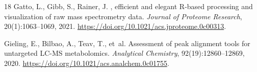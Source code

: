 \documentclass[11pt,twoside,openright]{book}
\begin{document}
\begin{thebibliography}{18}
Gatto, L., Gibb, S., Rainer, J.
, efficient and elegant {R}-based processing and visualization of raw mass spectrometry data.
\newblock \emph{Journal of Proteome Research}, 20(1):1063--1069, 2021.
\newblock \url{https://doi.org/10.1021/acs.jproteome.0c00313}.

Gieling, E., Bilbao, A., Teav, T., et~al.
\newblock Assessment of peak alignment tools for untargeted {LC-MS} metabolomics.
\newblock \emph{Analytical Chemistry}, 92(19):12860--12869, 2020.
\newblock \url{https://doi.org/10.1021/acs.analchem.0c01755}.

\end{thebibliography}
\end{document}
